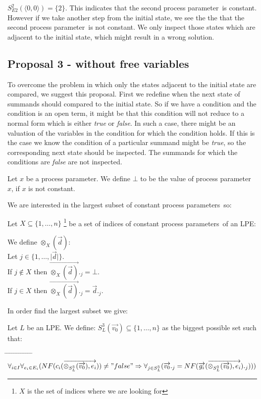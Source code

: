 \index{}\documentclass[a4paper,10pt]{article}
\theoremstyle{plain}
\theoremstyle{definition}
\newcommand{\ovr}{\overrightarrow}
\newcommand{\pp}{process parameter}
\newcommand{\pps}{process parameters}
\newcommand{\ti}{\textit}
\newcommand{\tab}{\hspace*{5.mm} \= \hspace*{5.mm} \= \hspace*{5.mm} \= \hspace*{5.mm} \= \hspace*{5.mm} \= \hspace*{5.mm}  \= \hspace*{5.mm}  \= \hspace*{5.mm}  \= \hspace*{5.mm} \= \hspace*{5.mm} \= \hspace*{5.mm}  \= \hspace*{5.mm}  \= \hspace*{5.mm}\kill}
\begin{document}
\begin{defn}
$S_{E2}^2(\langle 0,0 \rangle) = \lbrace 2 \rbrace$. This indicates that the second \pp\ is constant. However if we take another step from the initial state, we see the the that the second \pp\ is not constant. We only inspect those states which are adjacent to the initial state, which might result in a wrong solution.
\end{defn}

\subsection{Proposal 3 - without free variables}
To overcome the problem in which only the states adjacent to the initial state are compared, we suggest this proposal. First we redefine when the next state of summands should compared to the initial state. So if we have a condition and the condition is an open term, it might be that this condition will not reduce to a normal form which is either \ti{true} or \ti{false}. In such a case, there might be an valuation of the variables in the condition for which the condition holds. If this is the case we know the condition of a particular summand might be \ti{true}, so the corresponding next state should be inspected. The summands for which the conditions are \ti{false} are not inspected. \\

\begin{defn}[$\bot$] Let $x$ be a \pp . We define $\bot$ to be the value of \pp\ $x$, if $x$ is not constant. 
\end{defn}

We are interested in the largest subset of constant \pps\ so:

Let $X \subseteq \lbrace 1, \ldots, n \rbrace$ \footnote{$X$ is the set of indices where we are looking for} be a set of indices of constant \pps\ of an LPE:

\begin{defn} We define $\otimes_X(\ovr{d})$:\\
Let $j \in \lbrace 1, \dots, \vert \ovr{d} \vert \rbrace $. \\
If $j \not\in X$ then $\ovr{\otimes_X(\ovr{d})}._j = \bot $. \\
If $j \in X$ then $\ovr{\otimes_X(\ovr{d})}._j = \ovr{d}._j$.\\
\end{defn}

In order find the largest subset we give:

\begin{defn} \label{def:sug3} Let $L$ be an LPE. We define: $ S_L^3(\ovr{v_0}) \subseteq \lbrace 1, \ldots, n \rbrace $ 
 as the biggest possible set such that:\\ 
\begin{tabbing}
\tab
\> $\forall_{i \in I}\forall_{e_i \in E_i} (NF( c_i ( \ovr{\otimes_{S_L^3}(\ovr{v_0}), e_i} ) ) \not= "false" \Rightarrow \forall_{j \in S_L^3}(\ovr{v_0}._j =  NF( \ovr{g_i}(\ovr{\otimes_{S_L^3}(\ovr{v_0}), e_i} )._j))) $
\end{tabbing}
\end{defn}
\end{document}
